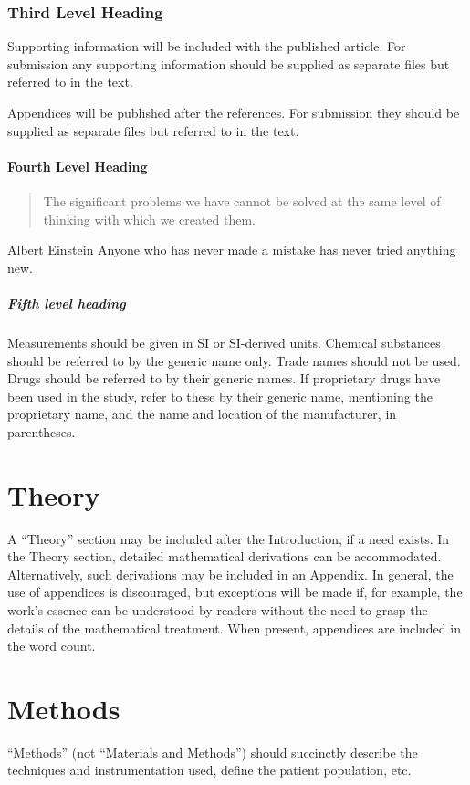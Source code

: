 \documentclass[num-refs]{wiley-article}
\begin{document}
\subsubsection{Third Level Heading}
Supporting information will be included with the published article. 
For submission any supporting information should be supplied as separate files but referred to in the text.

Appendices will be published after the references. 
For submission they should be supplied as separate files but referred to in the text.

\paragraph{Fourth Level Heading}
\begin{quote}
The significant problems we have cannot be solved at the same level of thinking with which we created them.
\end{quote}

\begin{epigraph}{Albert Einstein}
Anyone who has never made a mistake has never tried anything new.
\end{epigraph}

\subparagraph{Fifth level heading}
Measurements should be given in SI or SI-derived units.
Chemical substances should be referred to by the generic name only. 
Trade names should not be used. 
Drugs should be referred to by their generic names. 
If proprietary drugs have been used in the study, refer to these by their generic name, mentioning the proprietary name, and the name and location of the manufacturer, in parentheses.

\section{Theory}
A “Theory” section may be included after the Introduction, if a need exists. 
In the Theory section, detailed mathematical derivations can be accommodated. 
Alternatively, such derivations may be included in an Appendix. 
In general, the use of appendices is discouraged, but exceptions will be made if, for example, the work’s essence can be understood by readers without the need to grasp the details of the mathematical treatment. 
When present, appendices are included in the word count.

\section{Methods}
“Methods” (not “Materials and Methods”) should succinctly describe the techniques and instrumentation used, define the patient population, etc.
\end{document}
